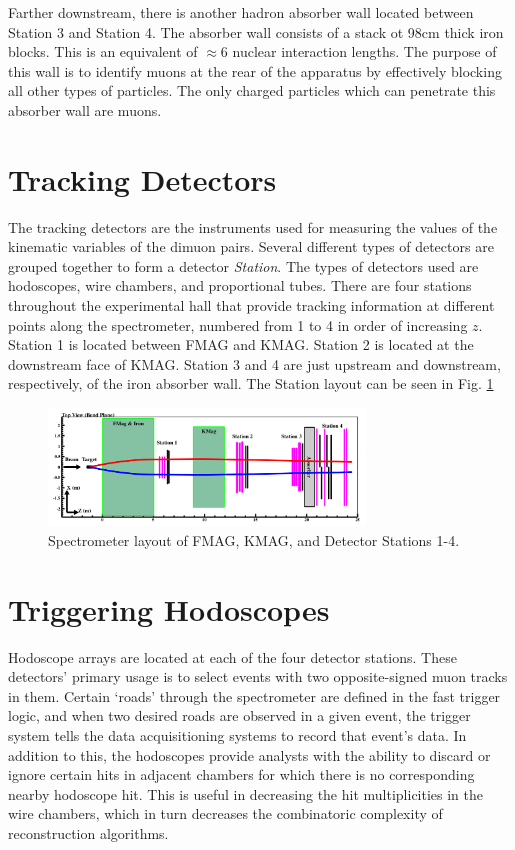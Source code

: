 Farther downstream, there is another hadron absorber wall located between Station 3 and Station 4. The absorber wall consists of a stack ot 98cm thick iron blocks. This is an equivalent of $\approx6$ nuclear interaction lengths. The purpose of this wall is to identify muons at the rear of the apparatus by effectively blocking all other types of particles. The only charged particles which can penetrate this absorber wall are muons.

\section{Tracking Detectors}

The tracking detectors are the instruments used for measuring the values of the kinematic variables of the dimuon pairs. Several different types of detectors are grouped together to form a detector \emph{Station}. The types of detectors used are hodoscopes, wire chambers, and proportional tubes. There are four stations throughout the experimental hall that provide tracking information at different points along the spectrometer, numbered from 1 to 4 in order of increasing $z$. Station 1 is located between FMAG and KMAG. Station 2 is located at the downstream face of KMAG. Station 3 and 4 are just upstream and downstream, respectively, of the iron absorber wall. The Station layout can be seen in Fig. \ref{fig:stations}

\begin{figure}
	\centering
	\includegraphics[width=0.75\textwidth]{figures/stations.png}
	\caption{Spectrometer layout of FMAG, KMAG, and Detector Stations 1-4.}
	\label{fig:stations}
\end{figure}

\section{Triggering Hodoscopes}

Hodoscope arrays are located at each of the four detector stations. These detectors' primary usage is to select events with two opposite-signed muon tracks in them. Certain `roads' through the spectrometer are defined in the fast trigger logic, and when two desired roads are observed in a given event, the trigger system tells the data acquisitioning systems to record that event's data. In addition to this, the hodoscopes provide analysts with the ability to discard or ignore certain hits in adjacent chambers for which there is no corresponding nearby hodoscope hit. This is useful in decreasing the hit multiplicities in the wire chambers, which in turn decreases the combinatoric complexity of reconstruction algorithms.

